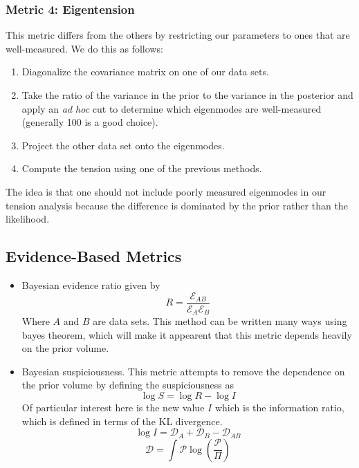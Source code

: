 \subsubsection{Metric 4: Eigentension}
This metric differs from the others by restricting our parameters to ones that are well-measured. We do this as follows:
\begin{enumerate}
	\item Diagonalize the covariance matrix on one of our data sets.
	\item Take the ratio of the variance in the prior to the variance in the posterior and apply an \textit{ad hoc} cut to determine which eigenmodes are well-measured (generally 100 is a good choice).
	\item Project the other data set onto the eigenmodes.
	\item Compute the tension using one of the previous methods.
\end{enumerate}
The idea is that one should not include poorly measured eigenmodes in our tension analysis because the difference is dominated by the prior rather than the likelihood.
\subsection{Evidence-Based Metrics}
\begin{itemize}
	\item Bayesian evidence ratio given by
	\begin{equation}
		R = \frac{\mathcal{E}_{AB}}{\mathcal{E}_A\mathcal{E}_B}
	\end{equation}
	Where $A$ and $B$ are data sets. This method can be written many ways using bayes theorem, which will make it appearent that this metric depends heavily on the prior volume.
    \item Bayesian suspiciousness. This metric attempts to remove the dependence on the prior volume by defining the suspiciousness as 
	\begin{equation}
		\log S = \log R - \log I
	\end{equation}
	Of particular interest here is the new value $I$ which is the information ratio, which is defined in terms of the KL divergence.
	\begin{equation}
		\log I = \mathcal{D}_A + \mathcal{D}_B - \mathcal{D}_{AB}
	\end{equation}
	\begin{equation}
		\mathcal{D} = \int \mathcal{P} \log(\frac{\mathcal{P}}{\Pi})
	\end{equation}
\end{itemize}
